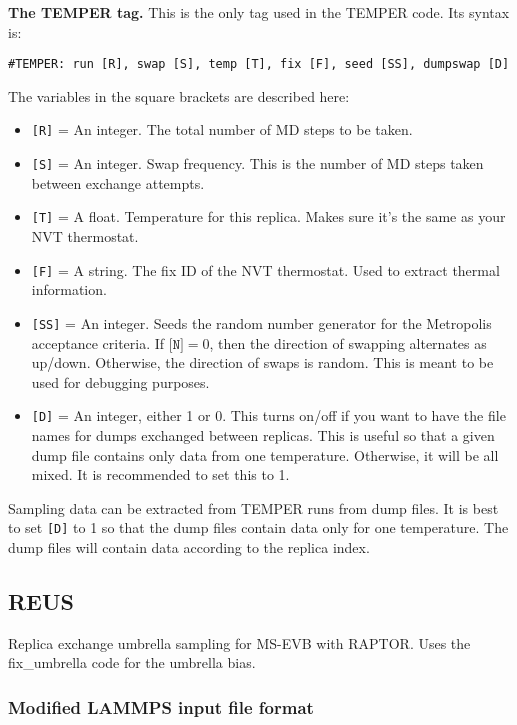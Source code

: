 \documentclass[10pt]{article}
\begin{document}
\textbf{The TEMPER tag.} This is the only tag used in the TEMPER code. Its syntax is:
\begin{verbatim}
#TEMPER: run [R], swap [S], temp [T], fix [F], seed [SS], dumpswap [D]
\end{verbatim}
The variables in the square brackets are described here:
\begin{itemize}
\item	\texttt{[R]} = An integer. The total number of MD steps to be taken.
\item	\texttt{[S]} = An integer. Swap frequency. This is the number of MD steps taken between exchange attempts.
\item	\texttt{[T]} = A float. Temperature for this replica. Makes sure it's the same as your NVT thermostat.
\item 	\texttt{[F]} = A string. The fix ID of the NVT thermostat. Used to extract thermal information.
\item	\texttt{[SS]} = An integer. Seeds the random number generator for the Metropolis
		acceptance criteria.
		If $\texttt{[N]} = 0$,
		then the direction of swapping alternates as up/down. Otherwise, the direction of swaps
		is random. This is meant to be used for debugging purposes.
\item	\texttt{[D]} = An integer, either 1 or 0. This turns on/off if you want to have the file names for dumps
		exchanged between replicas. This is useful so that a given dump file contains only data from one temperature.
		Otherwise, it will be all mixed. It is recommended to set this to 1.
\end{itemize}

Sampling data can be extracted from TEMPER runs from dump files. It is best to set \texttt{[D]} to 1 so that
the dump files contain data only for one temperature. The dump files will contain data according to the
replica index.


\subsection{REUS}

Replica exchange umbrella sampling for MS-EVB with RAPTOR. Uses the fix\_umbrella code for the umbrella bias.

\subsubsection{Modified LAMMPS input file format}
\end{document}
